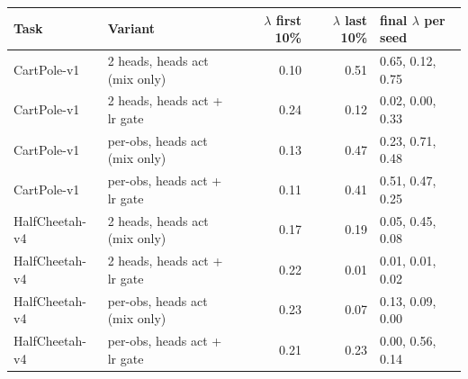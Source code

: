 \begin{tabular}{llrrl}
\toprule
Task & Variant & $\lambda$ first 10\% & $\lambda$ last 10\% & final $\lambda$ per seed \\
\midrule
CartPole-v1 & 2 heads, heads act (mix only) & 0.10 & 0.51 & 0.65, 0.12, 0.75 \\
CartPole-v1 & 2 heads, heads act + lr gate & 0.24 & 0.12 & 0.02, 0.00, 0.33 \\
CartPole-v1 & per-obs, heads act (mix only) & 0.13 & 0.47 & 0.23, 0.71, 0.48 \\
CartPole-v1 & per-obs, heads act + lr gate & 0.11 & 0.41 & 0.51, 0.47, 0.25 \\
HalfCheetah-v4 & 2 heads, heads act (mix only) & 0.17 & 0.19 & 0.05, 0.45, 0.08 \\
HalfCheetah-v4 & 2 heads, heads act + lr gate & 0.22 & 0.01 & 0.01, 0.01, 0.02 \\
HalfCheetah-v4 & per-obs, heads act (mix only) & 0.23 & 0.07 & 0.13, 0.09, 0.00 \\
HalfCheetah-v4 & per-obs, heads act + lr gate & 0.21 & 0.23 & 0.00, 0.56, 0.14 \\
\bottomrule
\end{tabular}

